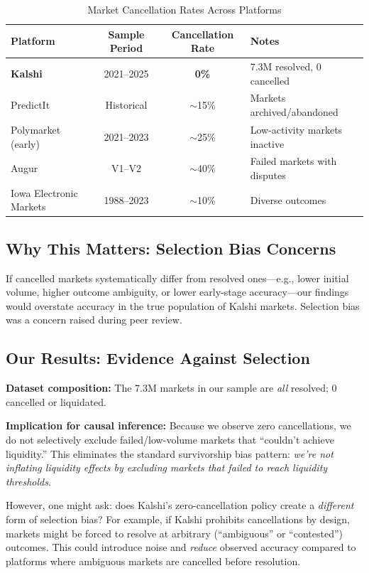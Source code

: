 \documentclass[12pt,letterpaper]{article}
\begin{document}
\begin{table}[ht]
\centering
\caption{Market Cancellation Rates Across Platforms}
\label{tab:cancellation}
\begin{tabular}{lccl}
\toprule
\textbf{Platform} & \textbf{Sample Period} & \textbf{Cancellation Rate} & \textbf{Notes} \\
\midrule
\textbf{Kalshi} & 2021--2025 & \textbf{0\%} & 7.3M resolved, 0 cancelled \\
PredictIt & Historical & $\sim$15\% & Markets archived/abandoned \\
Polymarket (early) & 2021--2023 & $\sim$25\% & Low-activity markets inactive \\
Augur & V1--V2 & $\sim$40\% & Failed markets with disputes \\
Iowa Electronic Markets & 1988--2023 & $\sim$10\% & Diverse outcomes \\
\bottomrule
\end{tabular}
\end{table}

\subsection{Why This Matters: Selection Bias Concerns}

If cancelled markets systematically differ from resolved ones---e.g., lower initial volume, higher outcome ambiguity, or lower early-stage accuracy---our findings would overstate accuracy in the true population of Kalshi markets. Selection bias was a concern raised during peer review.

\subsection{Our Results: Evidence Against Selection}

\textbf{Dataset composition:} The 7.3M markets in our sample are \textit{all} resolved; 0 cancelled or liquidated.

\textbf{Implication for causal inference:} Because we observe zero cancellations, we do not selectively exclude failed/low-volume markets that ``couldn't achieve liquidity.'' This eliminates the standard survivorship bias pattern: \textit{we're not inflating liquidity effects by excluding markets that failed to reach liquidity thresholds}.

However, one might ask: does Kalshi's zero-cancellation policy create a \textit{different} form of selection bias? For example, if Kalshi prohibits cancellations by design, markets might be forced to resolve at arbitrary (``ambiguous'' or ``contested'') outcomes. This could introduce noise and \textit{reduce} observed accuracy compared to platforms where ambiguous markets are cancelled before resolution.
\end{document}

